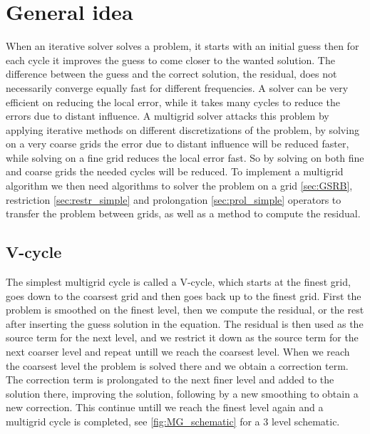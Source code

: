 
\section{General idea}

	When an iterative solver solves a problem, it starts with an initial guess then for each cycle it improves the guess to come closer to the
	wanted solution. The difference between the guess and the correct solution, the residual, does not necessarily converge equally fast for different frequencies.
	A solver can be very efficient on reducing the local error, while it takes many cycles to reduce the errors due to distant influence.
	A multigrid solver attacks this problem by applying iterative methods on different discretizations of the problem, by solving on a very coarse grids
	the error due to distant influence will be reduced faster, while solving on a fine grid reduces the local error fast. So by solving on both
	fine and coarse grids the needed cycles will be reduced. To implement a multigrid algorithm we then need algorithms to solver the problem on a grid \cref{sec:GSRB},
	restriction	\cref{sec:restr_simple} and prolongation \cref{sec:prol_simple} operators to transfer the problem between grids, as well as a method to compute the residual.


	\subsection{V-cycle}
		The simplest multigrid cycle is called a V-cycle, which starts at the finest grid, goes down to the coarsest grid and then goes back up
		to the finest grid.	First the problem is smoothed on the finest level, then we compute the residual, or the rest after inserting the guess solution
		in the equation. The residual is then used as the source term for the next level, and we restrict it down as the source term for the next
		coarser level and repeat untill we reach the coarsest level. When we reach the coarsest level the problem is solved there and we obtain a correction
		term. The correction term is prolongated to the next finer level and added to the solution there, improving the solution, following by a new smoothing
		to obtain a new correction. This continue untill we reach the finest level again and a multigrid cycle is completed, see \cref{fig:MG_schematic} for a 3
		level schematic.

